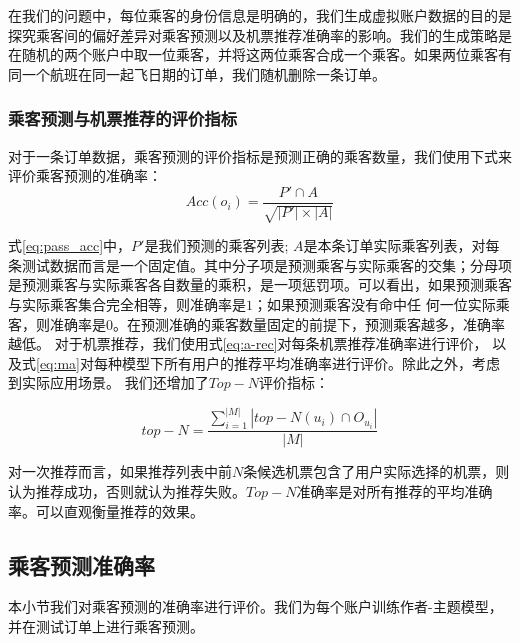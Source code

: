 在我们的问题中，每位乘客的身份信息是明确的，我们生成虚拟账户数据的目的是探究乘客间的偏好差异对乘客预测以及机票推荐准确率的影响。我们的生成策略是在随机的两个账户中取一位乘客，并将这两位乘客合成一个乘客。如果两位乘客有同一个航班在同一起飞日期的订单，我们随机删除一条订单。

\subsubsection{乘客预测与机票推荐的评价指标}

对于一条订单数据，乘客预测的评价指标是预测正确的乘客数量，我们使用下式来评价乘客预测的准确率：
\begin{equation}
\label{eq:pass_acc}
Acc(o_i) = \frac{P' \cap A}{\sqrt{|P'| \times |A|}}
\end{equation}

式\ref{eq:pass_acc}中，$P'$是我们预测的乘客列表; $A$是本条订单实际乘客列表，对每条测试数据而言是一个固定值。其中分子项是预测乘客与实际乘客的交集；分母项是预测乘客与实际乘客各自数量的乘积，是一项惩罚项。可以看出，如果预测乘客与实际乘客集合完全相等，则准确率是$1$；如果预测乘客没有命中任
何一位实际乘客，则准确率是$0$。在预测准确的乘客数量固定的前提下，预测乘客越多，准确率越低。
对于机票推荐，我们使用式\ref{eq:a-rec}对每条机票推荐准确率进行评价，
以及式\ref{eq:ma}对每种模型下所有用户的推荐平均准确率进行评价。除此之外，考虑到实际应用场景。
我们还增加了$Top-N$评价指标：

\begin{equation}
\label{eq:topn}
top-N = \frac{\sum_{i=1}^{|M|}|top-N(u_i) \cap O_{u_i}|}{|M|}
\end{equation}

对一次推荐而言，如果推荐列表中前$N$条候选机票包含了用户实际选择的机票，则认为推荐成功，否则就认为推荐失败。$Top-N$准确率是对所有推荐的平均准确率。可以直观衡量推荐的效果。


\subsection{乘客预测准确率}
本小节我们对乘客预测的准确率进行评价。我们为每个账户训练作者-主题模型，并在测试订单上进行乘客预测。
\begin{figure}[!h]
\centering
{}
\end{figure}

